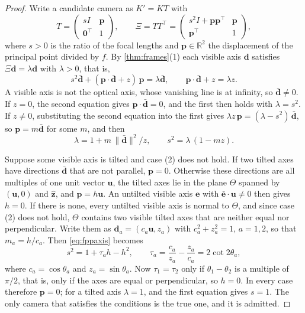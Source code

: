 \documentclass[pdflatex,sn-mathphys-num,iicol]{sn-jnl}
\newcommand{\vd}{\mathbf{d}}
\theoremstyle{thmstyleone}
\theoremstyle{thmstylethree}
\theoremstyle{thmstyletwo}
\begin{document}
\begin{proof}
Write a candidate camera as $K'=KT$ with
\[
T=\begin{pmatrix} sI & \mathbf p\\ \mathbf 0^{\top} & 1\end{pmatrix},\qquad
\Xi=TT^{\top}=\begin{pmatrix} s^2I+\mathbf p\mathbf p^{\top} & \mathbf p\\ \mathbf p^{\top} & 1\end{pmatrix},
\]
where $s>0$ is the ratio of the focal lengths and $\mathbf p\in\mathbb R^2$ the displacement of the principal point divided by $f$. By \cref{thm:frames}(1) each visible axis $\vd$ satisfies $\Xi\vd=\lambda\vd$ with $\lambda>0$, that is,
\[
s^2\bar{\vd}+(\mathbf p\cdot\bar{\vd}+z)\,\mathbf p=\lambda\bar{\vd},\qquad \mathbf p\cdot\bar{\vd}+z=\lambda z .
\]
A visible axis is not the optical axis, whose vanishing line is at infinity, so $\bar{\vd}\neq0$. If $z=0$, the second equation gives $\mathbf p\cdot\bar{\vd}=0$, and the first then holds with $\lambda=s^2$. If $z\neq0$, substituting the second equation into the first gives $\lambda z\,\mathbf p=(\lambda-s^2)\,\bar{\vd}$, so $\mathbf p=m\bar{\vd}$ for some $m$, and then
\begin{equation}
\lambda=1+m\,\|\bar{\vd}\|^2/z,\qquad s^2=\lambda\,(1-mz).
\label{eq:fppaxis}
\end{equation}

Suppose some visible axis is tilted and case (2) does not hold. If two tilted axes have directions $\bar{\vd}$ that are not parallel, $\mathbf p=0$. Otherwise these directions are all multiples of one unit vector $\mathbf u$, the tilted axes lie in the plane $\Theta$ spanned by $(\mathbf u,0)$ and $\hat{\mathbf z}$, and $\mathbf p=h\mathbf u$. An untilted visible axis $\mathbf e$ with $\bar{\mathbf e}\cdot\mathbf u\neq0$ then gives $h=0$. If there is none, every untilted visible axis is normal to $\Theta$, and since case (2) does not hold, $\Theta$ contains two visible tilted axes that are neither equal nor perpendicular. Write them as $\vd_a=(c_a\mathbf u,z_a)$ with $c_a^2+z_a^2=1$, $a=1,2$, so that $m_a=h/c_a$. Then \eqref{eq:fppaxis} becomes
\[
s^2=1+\tau_ah-h^2,\qquad \tau_a=\frac{c_a}{z_a}-\frac{z_a}{c_a}=2\cot2\theta_a ,
\]
where $c_a=\cos\theta_a$ and $z_a=\sin\theta_a$. Now $\tau_1=\tau_2$ only if $\theta_1-\theta_2$ is a multiple of $\pi/2$, that is, only if the axes are equal or perpendicular, so $h=0$. In every case therefore $\mathbf p=0$; for a tilted axis $\lambda=1$, and the first equation gives $s=1$. The only camera that satisfies the conditions is the true one, and it is admitted.


\end{proof}
\end{document}
